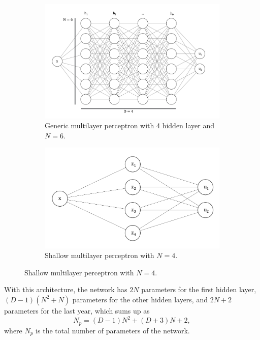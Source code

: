 \begin{figure}[h!]
    \centering
    \begin{subfigure}[b]{0.45\textwidth}
        \includegraphics[width=\textwidth]{img/DeepMLP.png}
        \caption{Generic multilayer perceptron with 4 hidden layer and $N=6$.}
        \label{fig:vpinndeepmlp}
    \end{subfigure}
    \hfill
    \begin{subfigure}[b]{0.45\textwidth}
        \includegraphics[width=\textwidth]{img/ShallowMLP.png}
        \caption{Shallow multilayer perceptron with $N=4$.}
        \label{fig:vpinnshallowmlp}
    \end{subfigure}
\end{figure}

With this architecture, the network has $2N$ parameters for the first hidden layer, $(D-1)(N^2+N)$ parameters for the other hidden layers, and $2N+2$ parameters for the last year, which sums up as
\begin{equation}
    \label{eq:vpinnsparameters}
    N_p = (D-1)N^2+(D+3)N+2,
\end{equation}
where $N_p$ is the total number of parameters of the network.

